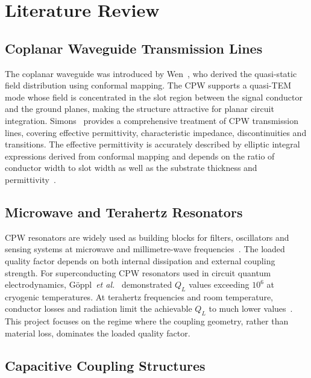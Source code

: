 \documentclass[12pt,a4paper]{article}
\begin{document}
\newpage
\section{Literature Review}
\label{sec:litreview}

\subsection{Coplanar Waveguide Transmission Lines}

The coplanar waveguide was introduced by Wen~\cite{Wen1969}, who derived
the quasi-static field distribution using conformal mapping. The CPW
supports a quasi-TEM mode whose field is concentrated in the slot region
between the signal conductor and the ground planes, making the structure
attractive for planar circuit integration. Simons~\cite{Simons2001}
provides a comprehensive treatment of CPW transmission lines, covering
effective permittivity, characteristic impedance, discontinuities and
transitions. The effective permittivity is accurately described by
elliptic integral expressions derived from conformal mapping and depends
on the ratio of conductor width to slot width as well as the substrate
thickness and permittivity~\cite{Ghione1987}.

\subsection{Microwave and Terahertz Resonators}

CPW resonators are widely used as building blocks for filters, oscillators
and sensing systems at microwave and millimetre-wave
frequencies~\cite{Pozar2011}. The loaded quality factor depends on both
internal dissipation and external coupling strength. For superconducting
CPW resonators used in circuit quantum electrodynamics,
G\"{o}ppl~\textit{et al.}~\cite{Goppl2008} demonstrated $Q_L$ values
exceeding $10^6$ at cryogenic temperatures. At terahertz frequencies and
room temperature, conductor losses and radiation limit the achievable
$Q_L$ to much lower values~\cite{Siegel2002}. This project focuses on
the regime where the coupling geometry, rather than material loss,
dominates the loaded quality factor.

\subsection{Capacitive Coupling Structures}
\end{document}
